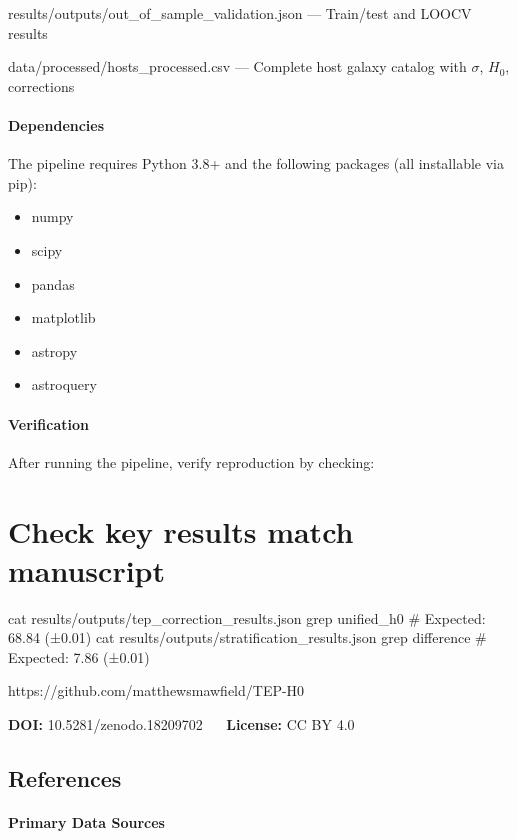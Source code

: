\documentclass[
]{article}
\begin{document}
results/outputs/out\_of\_sample\_validation.json --- Train/test and
LOOCV results

data/processed/hosts\_processed.csv --- Complete host galaxy catalog
with \(\sigma\), \(H_0\), corrections

\paragraph{Dependencies}\label{dependencies}

The pipeline requires Python 3.8+ and the following packages (all
installable via pip):

\begin{itemize}
\item
  numpy
\item
  scipy
\item
  pandas
\item
  matplotlib
\item
  astropy
\item
  astroquery
\end{itemize}

\paragraph{Verification}\label{verification}

After running the pipeline, verify reproduction by checking:

\section{Check key results match
manuscript}\label{check-key-results-match-manuscript}

cat results/outputs/tep\_correction\_results.json \textbar{} grep
unified\_h0 \# Expected: 68.84 (±0.01) cat
results/outputs/stratification\_results.json \textbar{} grep difference
\# Expected: 7.86 (±0.01)

https://github.com/matthewsmawfield/TEP-H0

\textbf{DOI:} 10.5281/zenodo.18209702 ~\textbar~ \textbf{License:} CC BY
4.0

\subsection{References}\label{references}

\paragraph{Primary Data Sources}\label{primary-data-sources}
\end{document}
